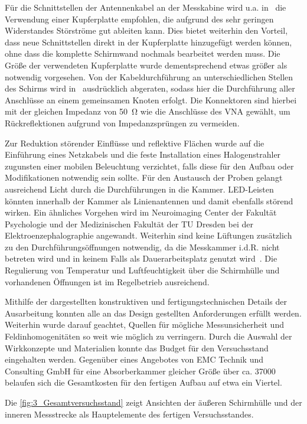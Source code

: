 Für die Schnittstellen der Antennenkabel an der Messkabine wird u.a. in~\cite{EM_Schirmung, EMV} die Verwendung einer Kupferplatte empfohlen, die aufgrund des sehr geringen Widerstandes Störströme gut ableiten kann. Dies bietet weiterhin den Vorteil, dass neue Schnittstellen direkt in der Kupferplatte hinzugefügt werden können, ohne dass die komplette Schirmwand nochmals bearbeitet werden muss. Die Größe der verwendeten Kupferplatte wurde dementsprechend etwas größer als notwendig vorgesehen. Von der Kabeldurchführung an unterschiedlichen Stellen des Schirms wird in~\cite{EM_Schirmung, EMV, Design_of_shielded_enclosures} ausdrücklich abgeraten, sodass hier die Durchführung aller Anschlüsse an einem gemeinsamen Knoten erfolgt. Die Konnektoren sind hierbei mit der gleichen Impedanz von \SI{50}{\ohm} wie die Anschlüsse des \ac{VNA} gewählt, um Rückreflektionen aufgrund von Impedanzsprüngen zu vermeiden. 
\par
\vspace{\linespace}
Zur Reduktion störender Einflüsse und reflektive Flächen wurde auf die Einführung eines Netzkabels und die feste Installation eines Halogenstrahler zugunsten einer mobilen Beleuchtung verzichtet, falls diese für den Aufbau oder Modifikationen notwendig sein sollte. Für den Austausch der Proben gelangt ausreichend Licht durch die Durchführungen in die Kammer. LED-Leisten könnten innerhalb der Kammer als Linienantennen und damit ebenfalls störend wirken. Ein ähnliches Vorgehen wird im Neuroimaging Center der Fakultät Psychologie und der Medizinischen Fakultät der TU Dresden bei der Elektroenzephalographie angewandt. Weiterhin sind keine Lüftungen zusätzlich zu den Durchführungsöffnungen notwendig, da die Messkammer i.d.R. nicht betreten wird und in keinem Falls als Dauerarbeitsplatz genutzt wird~\cite{EM_Schirmung}. Die Regulierung von Temperatur und Luftfeuchtigkeit über die Schirmhülle und vorhandenen Öffnungen ist im Regelbetrieb ausreichend.  

    
\par
\vspace{\linespace}

Mithilfe der dargestellten konstruktiven und fertigungstechnischen Details der Ausarbeitung konnten alle an das Design gestellten Anforderungen erfüllt werden. Weiterhin wurde darauf geachtet, Quellen für mögliche Messunsicherheit und Feldinhomogenitäten so weit wie möglich zu verringern. Durch die Auswahl der Wirkkonzepte und Materialien konnte das Budget für den Versuchsstand eingehalten werden. Gegenüber eines Angebotes von EMC Technik und Consulting GmbH für eine Absorberkammer gleicher Größe über ca. \SI{37000}{\text{\euro}} belaufen sich die Gesamtkosten für den fertigen Aufbau auf etwa ein Viertel. 
\par
\vspace{\linespace}
Die \Abb\ref{fig:3_Gesamtversuchsstand} zeigt Ansichten der äußeren Schirmhülle und der inneren Messstrecke als Hauptelemente des fertigen Versuchsstandes.

